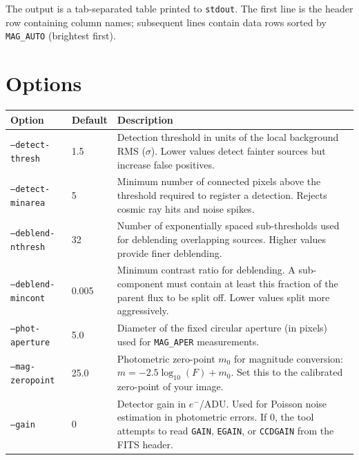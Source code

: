 \documentclass[11pt,fleqn]{book}
\begin{document}
The output is a tab-separated table printed to \texttt{stdout}. The first line is the header row containing column names; subsequent lines contain data rows sorted by \texttt{MAG\_AUTO} (brightest first).

\section{Options}

\begin{center}
\begin{longtable}{L{4.0cm} C{1.5cm} L{7.0cm}}
\toprule
\textbf{Option} & \textbf{Default} & \textbf{Description} \\
\midrule
\endhead

\texttt{--detect-thresh} & 1.5 & Detection threshold in units of the local background RMS ($\sigma$). Lower values detect fainter sources but increase false positives. \\
\midrule

\texttt{--detect-minarea} & 5 & Minimum number of connected pixels above the threshold required to register a detection. Rejects cosmic ray hits and noise spikes. \\
\midrule

\texttt{--deblend-nthresh} & 32 & Number of exponentially spaced sub-thresholds used for deblending overlapping sources. Higher values provide finer deblending. \\
\midrule

\texttt{--deblend-mincont} & 0.005 & Minimum contrast ratio for deblending. A sub-component must contain at least this fraction of the parent flux to be split off. Lower values split more aggressively. \\
\midrule

\texttt{--phot-aperture} & 5.0 & Diameter of the fixed circular aperture (in pixels) used for \texttt{MAG\_APER} measurements. \\
\midrule

\texttt{--mag-zeropoint} & 25.0 & Photometric zero-point $m_0$ for magnitude conversion: $m = -2.5\log_{10}(F) + m_0$. Set this to the calibrated zero-point of your image. \\
\midrule

\texttt{--gain} & 0 & Detector gain in $e^-$/ADU. Used for Poisson noise estimation in photometric errors. If 0, the tool attempts to read \texttt{GAIN}, \texttt{EGAIN}, or \texttt{CCDGAIN} from the FITS header. \\
\midrule


\end{longtable}
\end{center}
\end{document}
